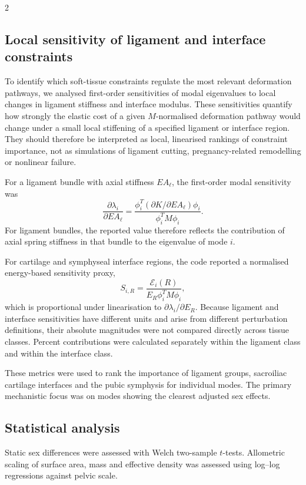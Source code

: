 \documentclass[openacc]{rsproca_new}
\begin{document}
\begin{multicols}{2}
\subsection{Local sensitivity of ligament and interface constraints}

To identify which soft-tissue constraints regulate the most relevant deformation pathways, we analysed first-order sensitivities of modal eigenvalues to local changes in ligament stiffness and interface modulus. These sensitivities quantify how strongly the elastic cost of a given $M$-normalised deformation pathway would change under a small local stiffening of a specified ligament or interface region. They should therefore be interpreted as local, linearised rankings of constraint importance, not as simulations of ligament cutting, pregnancy-related remodelling or nonlinear failure.

For a ligament bundle with axial stiffness $EA_{\ell}$, the first-order modal sensitivity was
\[
\frac{\partial \lambda_i}{\partial EA_{\ell}} =
\frac{\phi_i^{T}(\partial K/\partial EA_{\ell})\phi_i}
{\phi_i^{T}M\phi_i}.
\]
For ligament bundles, the reported value therefore reflects the contribution of axial spring stiffness in that bundle to the eigenvalue of mode $i$.

For cartilage and symphyseal interface regions, the code reported a normalised energy-based sensitivity proxy,
\[
S_{i,R} =
\frac{\mathcal{E}_{i}(R)}
{E_R \phi_i^{T}M\phi_i},
\]
which is proportional under linearisation to $\partial \lambda_i/\partial E_R$. Because ligament and interface sensitivities have different units and arise from different perturbation definitions, their absolute magnitudes were not compared directly across tissue classes. Percent contributions were calculated separately within the ligament class and within the interface class.

These metrics were used to rank the importance of ligament groups, sacroiliac cartilage interfaces and the pubic symphysis for individual modes. The primary mechanistic focus was on modes showing the clearest adjusted sex effects.

\subsection{Statistical analysis}

Static sex differences were assessed with Welch two-sample $t$-tests. Allometric scaling of surface area, mass and effective density was assessed using log--log regressions against pelvic scale.


\end{multicols}
\end{document}
